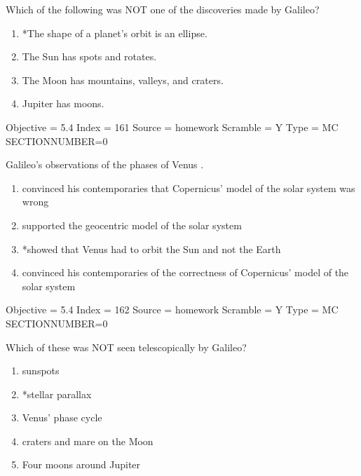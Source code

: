 \documentclass[11pt]{article}
\begin{document}
\begin{enumerate}
\begin{minipage}{\textwidth}
\begin{minipage}{\textwidth}
\item Which of the following was NOT one of the discoveries made by Galileo?
\begin{enumerate} 
\setlength{\itemsep}{1pt} 
\setlength{\parskip}{0pt} 
\setlength{\parsep}{0pt}
\setlength{\multicolsep}{1pt} 
\item *The shape of a planet's orbit is an ellipse.
\item The Sun has spots and rotates.
\item The Moon has mountains, valleys, and craters.
\item Jupiter has moons.
\end{enumerate} 
Objective = 5.4
Index = 161
Source = homework
Scramble = Y
Type = MC
SECTIONNUMBER=0
\end{minipage}
\end{minipage}
\vskip 0.20in

\begin{minipage}{\textwidth}
\begin{minipage}{\textwidth}
\item Galileo's observations of the phases of Venus  \underline{\hspace{0.5in}}.
\begin{enumerate} 
\setlength{\itemsep}{1pt} 
\setlength{\parskip}{0pt} 
\setlength{\parsep}{0pt}
\setlength{\multicolsep}{1pt} 
\item convinced his contemporaries that Copernicus' model of the solar system was wrong
\item supported the geocentric model of the solar system
\item *showed that Venus had to orbit the Sun and not the Earth
\item convinced his contemporaries of the correctness of Copernicus' model of the solar system
\end{enumerate} 
Objective = 5.4
Index = 162
Source = homework
Scramble = Y
Type = MC
SECTIONNUMBER=0
\end{minipage}
\end{minipage}
\vskip 0.20in

\begin{minipage}{\textwidth}
\begin{minipage}{\textwidth}
\item Which of these was NOT seen telescopically by Galileo?
\begin{multicols}{2}
\begin{enumerate} 
\setlength{\itemsep}{1pt} 
\setlength{\parskip}{0pt} 
\setlength{\parsep}{0pt}
\setlength{\multicolsep}{1pt} 
\item sunspots
\item *stellar parallax
\item Venus' phase cycle
\item craters and mare on the Moon
\item Four moons around Jupiter
\end{enumerate} 
\vfill 
\end{multicols}


\end{minipage}
\end{minipage}
\end{enumerate}
\end{document}
